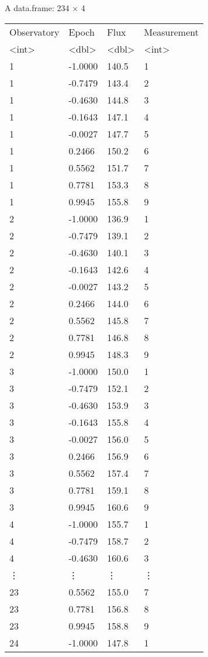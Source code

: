 \documentclass[11pt]{article}
\begin{document}
    A data.frame: 234 × 4
\begin{tabular}{llll}
 Observatory & Epoch & Flux & Measurement\\
 <int> & <dbl> & <dbl> & <int>\\
\hline
	 1 & -1.0000 & 140.5 & 1\\
	 1 & -0.7479 & 143.4 & 2\\
	 1 & -0.4630 & 144.8 & 3\\
	 1 & -0.1643 & 147.1 & 4\\
	 1 & -0.0027 & 147.7 & 5\\
	 1 &  0.2466 & 150.2 & 6\\
	 1 &  0.5562 & 151.7 & 7\\
	 1 &  0.7781 & 153.3 & 8\\
	 1 &  0.9945 & 155.8 & 9\\
	 2 & -1.0000 & 136.9 & 1\\
	 2 & -0.7479 & 139.1 & 2\\
	 2 & -0.4630 & 140.1 & 3\\
	 2 & -0.1643 & 142.6 & 4\\
	 2 & -0.0027 & 143.2 & 5\\
	 2 &  0.2466 & 144.0 & 6\\
	 2 &  0.5562 & 145.8 & 7\\
	 2 &  0.7781 & 146.8 & 8\\
	 2 &  0.9945 & 148.3 & 9\\
	 3 & -1.0000 & 150.0 & 1\\
	 3 & -0.7479 & 152.1 & 2\\
	 3 & -0.4630 & 153.9 & 3\\
	 3 & -0.1643 & 155.8 & 4\\
	 3 & -0.0027 & 156.0 & 5\\
	 3 &  0.2466 & 156.9 & 6\\
	 3 &  0.5562 & 157.4 & 7\\
	 3 &  0.7781 & 159.1 & 8\\
	 3 &  0.9945 & 160.6 & 9\\
	 4 & -1.0000 & 155.7 & 1\\
	 4 & -0.7479 & 158.7 & 2\\
	 4 & -0.4630 & 160.6 & 3\\
	 ⋮ & ⋮ & ⋮ & ⋮\\
	 23 &  0.5562 & 155.0 & 7\\
	 23 &  0.7781 & 156.8 & 8\\
	 23 &  0.9945 & 158.8 & 9\\
	 24 & -1.0000 & 147.8 & 1\\

\end{tabular}
\end{document}

